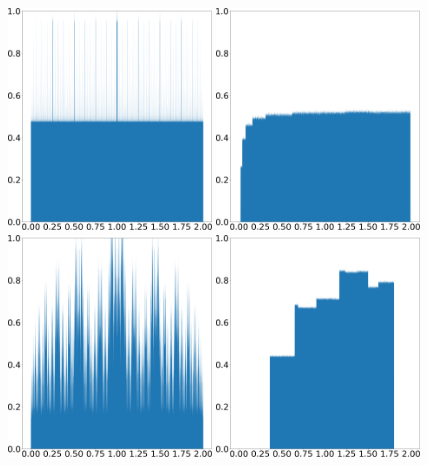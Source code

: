 \documentclass[preprint,12pt]{elsarticle}
\begin{document}
\begin{figure}
    \centering
    \includegraphics[width=0.48\textwidth]{tent_squashed_shadow_density_0.01.png}
    \hspace{0.02\textwidth}
    \includegraphics[width=0.48\textwidth]{tent_squashed_physical_density_0.01.png}
    \\ \vspace{0.02\textwidth}
    \includegraphics[width=0.48\textwidth]{tent_squashed_shadow_density_0.2.png}
    \hspace{0.02\textwidth}
    \includegraphics[width=0.48\textwidth]{tent_squashed_physical_density_0.2.png}

\end{figure}
\end{document}
